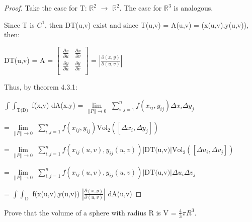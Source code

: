     \begin{proof}
        Take the case for T: $\mathbb{R}^2$ $\rightarrow$ $\mathbb{R}^2$.
        The case for $\mathbb{R}^3$ is analogous.

        Since T is $C^1$, then DT(u,v) exist and since
        T(u,v) = A(u,v) = (x(u,v),y(u,v)), then:

        \hspace{0.5cm}
        DT(u,v) = A =
        $
        \begin{bmatrix}
            \frac{\partial x}{\partial u} & \frac{\partial x}{\partial v} \\
            \frac{\partial y}{\partial u} & \frac{\partial y}{\partial v} \\
        \end{bmatrix}
        $
        = $|\frac{\partial(x,y)}{\partial(u,v)}|$

        Thus, by {\color{red} theorem 4.3.1}:

        \hspace{0.5cm}
        $\int \int_\text{T(D)}$ f(x,y) dA(x,y)
        = $\underset{||P|| \rightarrow 0}{\lim}$
            $\sum_{i,j=1}^n f(x_{ij},y_{ij}) \Delta x_i \Delta y_j$

        \hspace{0.5cm}
        = $\underset{||P|| \rightarrow 0}{\lim}$
            $\sum_{i,j=1}^n f(x_{ij},y_{ij})
            \text{Vol}_2([\Delta x_i , \Delta y_j])$

        \hspace{0.5cm}
        = $\underset{||P|| \rightarrow 0}{\lim}$
            $\sum_{i,j=1}^n f(x_{ij}(u,v),y_{ij}(u,v))
            |\text{DT(u,v)}| \text{Vol}_2([\Delta u_i , \Delta v_j])$

        \hspace{0.5cm}
        = $\underset{||P|| \rightarrow 0}{\lim}$
            $\sum_{i,j=1}^n f(x_{ij}(u,v),y_{ij}(u,v))
            |\text{DT(u,v)}| \Delta u_i \Delta v_j$

        \hspace{0.5cm}
        = $\int \int_\text{D}$ f(x(u,v),y(u,v))
            $|\frac{\partial(x,y)}{\partial(u,v)}|$ dA(u,v)
    \end{proof}

    \vspace{0.5cm}



    \begin{example}
        Prove that the volume of a sphere with radius R is
        V = $\frac{4}{3}\pi R^3$.  
    \end{example}


